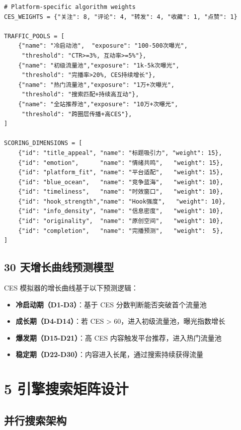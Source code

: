 \documentclass[12pt,a4paper]{ctexart}
\begin{document}
\begin{lstlisting}[style=pycode,caption={engines/viral\_scorer.py — 平台算法权重定义}]
# Platform-specific algorithm weights
CES_WEIGHTS = {"关注": 8, "评论": 4, "转发": 4, "收藏": 1, "点赞": 1}

TRAFFIC_POOLS = [
    {"name": "冷启动池",  "exposure": "100-500次曝光",
     "threshold": "CTR>=3%, 互动率>=5%"},
    {"name": "初级流量池","exposure": "1k-5k次曝光",
     "threshold": "完播率>20%, CES持续增长"},
    {"name": "热门流量池","exposure": "1万+次曝光",
     "threshold": "搜索匹配+持续高互动"},
    {"name": "全站推荐池","exposure": "10万+次曝光",
     "threshold": "跨圈层传播+高CES"},
]

SCORING_DIMENSIONS = [
    {"id": "title_appeal", "name": "标题吸引力", "weight": 15},
    {"id": "emotion",      "name": "情绪共鸣",   "weight": 15},
    {"id": "platform_fit", "name": "平台适配",   "weight": 15},
    {"id": "blue_ocean",   "name": "竞争蓝海",   "weight": 10},
    {"id": "timeliness",   "name": "时效窗口",   "weight": 10},
    {"id": "hook_strength","name": "Hook强度",   "weight": 10},
    {"id": "info_density", "name": "信息密度",   "weight": 10},
    {"id": "originality",  "name": "原创空间",   "weight": 10},
    {"id": "completion",   "name": "完播预测",   "weight":  5},
]
\end{lstlisting}

\subsection{30 天增长曲线预测模型}

CES 模拟器的增长曲线基于以下预测逻辑：

\begin{itemize}
  \item \textbf{冷启动期（D1-D3）}：基于 CES 分数判断能否突破首个流量池
  \item \textbf{成长期（D4-D14）}：若 CES > 60，进入初级流量池，曝光指数增长
  \item \textbf{爆发期（D15-D21）}：高 CES 内容触发平台推荐，进入热门流量池
  \item \textbf{稳定期（D22-D30）}：内容进入长尾，通过搜索持续获得流量
\end{itemize}


\section{5 引擎搜索矩阵设计}

\subsection{并行搜索架构}
\end{document}
